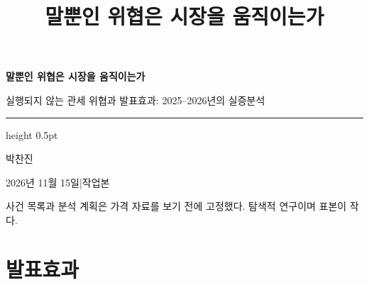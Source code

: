 \documentclass[aspectratio=169,9pt,t]{beamer}
\title{말뿐인 위협은 시장을 움직이는가}
\begin{document}
{
\begin{frame}[noframenumbering]
\vspace{14mm}
{\fontsize{24}{30}\selectfont\bfseries 말뿐인 위협은 시장을 움직이는가\par}
\vspace{3.5mm}
{\fontsize{13}{17}\selectfont 실행되지 않는 관세 위협과 발표효과: 2025--2026년의 실증분석\par}
\vspace{6mm}
{\color{ink}\hrule height 0.5pt}
\vspace{6mm}
{\large 박찬진\par}
\vspace{1.5mm}
{\small\color{mute} 2026년 11월 15일\quad|\quad 작업본\par}
\vfill
{\footnotesize\color{mute}\linespread{1.15}\selectfont 사건 목록과 분석 계획은 가격 자료를 보기 전에 고정했다. 탐색적 연구이며 표본이 작다.\par}
\vspace{6mm}
\end{frame}
}

\section{발표효과}
\end{document}
